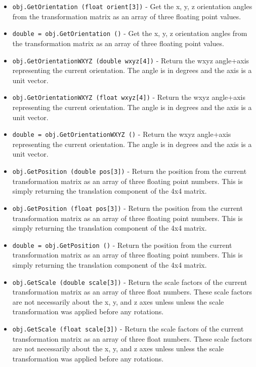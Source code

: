 \begin{itemize}
\item  \verb|obj.GetOrientation (float orient[3])| -  Get the x, y, z orientation angles from the transformation matrix as an
 array of three floating point values.  

\item  \verb|double = obj.GetOrientation ()| -  Get the x, y, z orientation angles from the transformation matrix as an
 array of three floating point values.  

\item  \verb|obj.GetOrientationWXYZ (double wxyz[4])| -  Return the wxyz angle+axis representing the current orientation.
 The angle is in degrees and the axis is a unit vector.

\item  \verb|obj.GetOrientationWXYZ (float wxyz[4])| -  Return the wxyz angle+axis representing the current orientation.
 The angle is in degrees and the axis is a unit vector.

\item  \verb|double = obj.GetOrientationWXYZ ()| -  Return the wxyz angle+axis representing the current orientation.
 The angle is in degrees and the axis is a unit vector.

\item  \verb|obj.GetPosition (double pos[3])| -  Return the position from the current transformation matrix as an array
 of three floating point numbers. This is simply returning the translation 
 component of the 4x4 matrix.

\item  \verb|obj.GetPosition (float pos[3])| -  Return the position from the current transformation matrix as an array
 of three floating point numbers. This is simply returning the translation 
 component of the 4x4 matrix.

\item  \verb|double = obj.GetPosition ()| -  Return the position from the current transformation matrix as an array
 of three floating point numbers. This is simply returning the translation 
 component of the 4x4 matrix.

\item  \verb|obj.GetScale (double scale[3])| -  Return the scale factors of the current transformation matrix as 
 an array of three float numbers.  These scale factors are not necessarily
 about the x, y, and z axes unless unless the scale transformation was
 applied before any rotations.  

\item  \verb|obj.GetScale (float scale[3])| -  Return the scale factors of the current transformation matrix as 
 an array of three float numbers.  These scale factors are not necessarily
 about the x, y, and z axes unless unless the scale transformation was
 applied before any rotations.  


\end{itemize}
